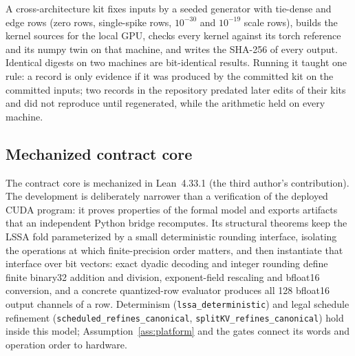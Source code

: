 \documentclass{article}
\begin{document}
A cross-architecture kit fixes inputs by a seeded generator with tie-dense and edge rows
(zero rows, single-spike rows, $10^{-30}$ and $10^{-19}$ scale rows), builds the kernel
sources for the local GPU, checks every kernel against its torch reference and its numpy twin
on that machine, and writes the SHA-256 of every output.  Identical digests on two machines
are bit-identical results.  Running it taught one rule: a record is only evidence if it was
produced by the committed kit on the committed inputs; two records in the repository predated
later edits of their kits and did not reproduce until regenerated, while the arithmetic held
on every machine.

\subsection{Mechanized contract core}
\label{sec:lean}

The contract core is mechanized in Lean~4.33.1 \cite{demoura2015lean} (the third author's
contribution).  The development is deliberately narrower than a
verification of the deployed CUDA program: it proves properties of the formal model and
exports artifacts that an independent Python bridge recomputes.  Its structural theorems
keep the LSSA fold parameterized by a small deterministic rounding interface, isolating the
operations at which finite-precision order matters, and then instantiate that interface over
bit vectors: exact dyadic decoding and integer rounding define finite binary32 addition and
division, exponent-field rescaling and bfloat16 conversion, and a concrete quantized-row
evaluator produces all 128 bfloat16 output channels of a row.  Determinism
(\texttt{lssa\_deterministic}) and legal schedule refinement
(\texttt{scheduled\_refines\_canonical}, \texttt{splitKV\_refines\_canonical}) hold inside
this model; Assumption~\ref{ass:platform} and the gates connect its words and operation
order to hardware.
\end{document}
